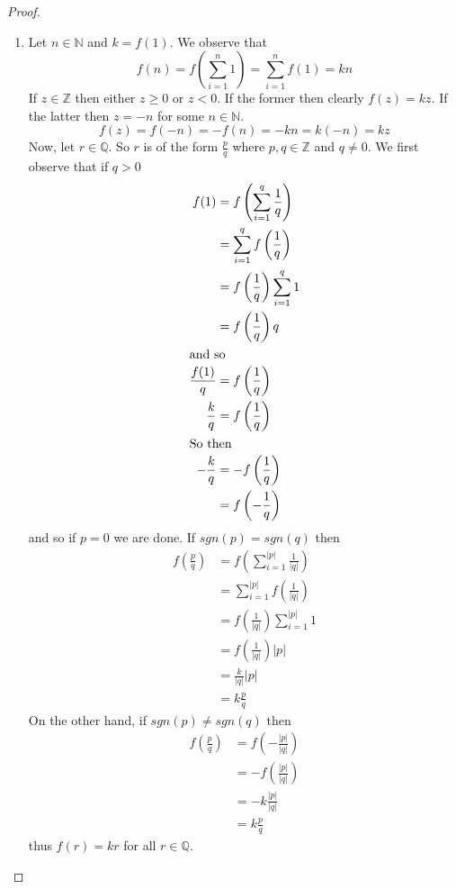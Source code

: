 \begin{enumerate}
\begin{proof}
\begin{enumerate}
            \item Let \( n \in \mathbb{N} \) and \( k = f(1) \). We observe that
            \[
            f(n) = f\left(\sum_{i=1}^{n}1\right) = \sum_{i=1}^{n} f(1) = kn
            \]
            If \( z \in \mathbb{Z} \) then either \( z \geq 0 \) or \( z < 0 \). If the former then clearly \( f(z) = kz \). If the latter then \( z = -n \) for some \( n \in \mathbb{N} \).
            \[
            f(z) = f(-n) = -f(n) = -kn = k(-n) = kz
            \]
            Now, let \( r \in \mathbb{Q} \). So \( r \) is of the form \( \frac{p}{q} \) where \( p,q \in \mathbb{Z} \) and \( q \neq 0 \). We first observe that if \( q > 0 \) 
            \begin{align*}
                f(1) &= f\left( \sum_{i=1}^{q} \frac{1}{q} \right) \\
                &= \sum_{i=1}^{q} f\left( \frac{1}{q} \right) \\
                &= f\left( \frac{1}{q} \right)\sum_{i=1}^{q} 1 \\
                &= f\left( \frac{1}{q} \right)q \\
                \intertext{and so}
                \frac{f(1)}{q} &= f\left( \frac{1}{q} \right) \\
                \frac{k}{q} &= f\left( \frac{1}{q} \right) \\
                \intertext{So then}
                -\frac{k}{q} &= -f\left( \frac{1}{q} \right) \\
                 &= f\left( - \frac{1}{q} \right)
            \end{align*}
            and so if \( p = 0 \) we are done. If \( sgn(p) = sgn(q) \) then 
            \begin{align*}
                f\left( \frac{p}{q} \right) &= f\left( \sum_{i=1}^{\vert p \vert} \frac{1}{\vert q \vert} \right) \\
                &= \sum_{i=1}^{\vert p \vert } f\left( \frac{1}{\vert q \vert} \right) \\
                &= f\left( \frac{1}{\vert q \vert} \right) \sum_{i=1}^{\vert p \vert} 1 \\
                &= f\left( \frac{1}{\vert q \vert} \right) \vert p \vert \\
                &= \frac{k}{\vert q \vert} \vert p \vert \\
                &= k \frac{p}{q}
            \end{align*}
            On the other hand, if \( sgn(p) \neq sgn(q) \) then
            \begin{align*}
                f\left( \frac{p}{q} \right) &= f\left( -\frac{\vert p \vert}{\vert q \vert} \right) \\
                &= - f\left( \frac{\vert p \vert}{\vert q \vert} \right) \\
                &= - k \frac{\vert p \vert}{\vert q \vert} \\
                &= k\frac{p}{q}
            \end{align*}
            thus \( f(r) = kr \) for all \( r \in \mathbb{Q} \). 
            

\end{enumerate}
\end{proof}
\end{enumerate}
